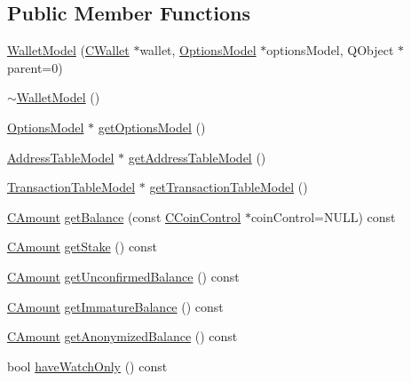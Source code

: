 \subsection*{Public Member Functions}
\begin{DoxyCompactItemize}
\item 
\hyperlink{class_wallet_model_af50d9654d2f20e4e4f0789dcb64ad6b1}{Wallet\+Model} (\hyperlink{class_c_wallet}{C\+Wallet} $\ast$wallet, \hyperlink{class_options_model}{Options\+Model} $\ast$options\+Model, Q\+Object $\ast$parent=0)
\item 
\hyperlink{class_wallet_model_a592c6cf71f62981c2925bbb19e83df8a}{$\sim$\+Wallet\+Model} ()
\item 
\hyperlink{class_options_model}{Options\+Model} $\ast$ \hyperlink{class_wallet_model_a96d53e56b3f8f07537ea2523f7a7d300}{get\+Options\+Model} ()
\item 
\hyperlink{class_address_table_model}{Address\+Table\+Model} $\ast$ \hyperlink{class_wallet_model_a89ed202e2dbc04aaa70d72872b95b351}{get\+Address\+Table\+Model} ()
\item 
\hyperlink{class_transaction_table_model}{Transaction\+Table\+Model} $\ast$ \hyperlink{class_wallet_model_afe9f7d149f1e8335033c69dab1dc277d}{get\+Transaction\+Table\+Model} ()
\item 
\hyperlink{amount_8h_a4eaf3a5239714d8c45b851527f7cb564}{C\+Amount} \hyperlink{class_wallet_model_ab448317375fa1e3a60559513b3af5f42}{get\+Balance} (const \hyperlink{class_c_coin_control}{C\+Coin\+Control} $\ast$coin\+Control=N\+U\+L\+L) const 
\item 
\hyperlink{amount_8h_a4eaf3a5239714d8c45b851527f7cb564}{C\+Amount} \hyperlink{class_wallet_model_a7de329168adb6cce6b1b73928a5dbb64}{get\+Stake} () const 
\item 
\hyperlink{amount_8h_a4eaf3a5239714d8c45b851527f7cb564}{C\+Amount} \hyperlink{class_wallet_model_aec4786b3a3c9e03a836b8e51e26c1ece}{get\+Unconfirmed\+Balance} () const 
\item 
\hyperlink{amount_8h_a4eaf3a5239714d8c45b851527f7cb564}{C\+Amount} \hyperlink{class_wallet_model_a7444972994dad1499ba204bb8734fd7b}{get\+Immature\+Balance} () const 
\item 
\hyperlink{amount_8h_a4eaf3a5239714d8c45b851527f7cb564}{C\+Amount} \hyperlink{class_wallet_model_ac456318679b5cd97d2e88f76720f6af0}{get\+Anonymized\+Balance} () const 
\item 
bool \hyperlink{class_wallet_model_aab93d19f9d98e3b984e81fd961ce35db}{have\+Watch\+Only} () const 
\item 

\end{DoxyCompactItemize}
